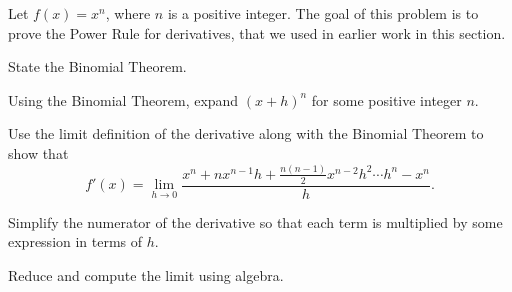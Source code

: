 \begin{activity} \label{A:2.4.Act6}
Let $f(x) = x^n$, where $n$ is a positive integer.  The goal of this problem is to prove the Power Rule for derivatives, that we used in earlier work in this section.
\ba
\item State the Binomial Theorem.

\item Using the Binomial Theorem, expand $(x + h)^n$ for some positive integer $n$.

\item Use the limit definition of the derivative along with the Binomial Theorem to show that
\[ f'(x) = \lim_{h \to 0} \dfrac{x^n+nx^{n-1}h + \frac{n(n-1)}{2}x^{n-2}h^2 \cdots h^n - x^n}{h}. \]

\item Simplify the numerator of the derivative so that each term is multiplied by some expression in terms of $h$.

\item Reduce and compute the limit using algebra.
\ea

\end{activity} 
